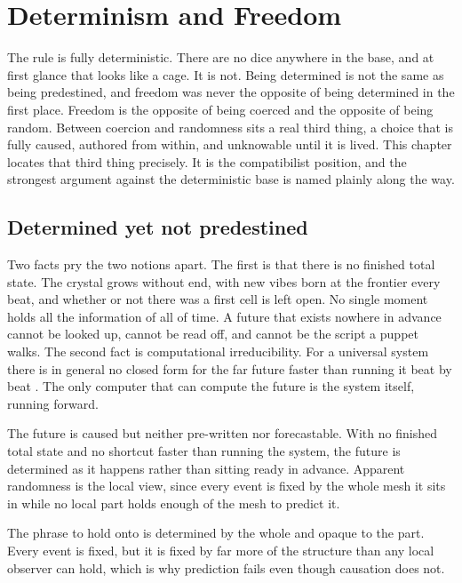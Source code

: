 \section{Determinism and Freedom}

The rule is fully deterministic. There are no dice anywhere in the base, and at first glance that looks like a
cage. It is not. Being determined is not the same as being predestined, and freedom was never the opposite of
being determined in the first place. Freedom is the opposite of being coerced and the opposite of being random.
Between coercion and randomness sits a real third thing, a choice that is fully caused, authored from within, and
unknowable until it is lived. This chapter locates that third thing precisely. It is the compatibilist position,
and the strongest argument against the deterministic base is named plainly along the way.

\subsection{Determined yet not predestined}

Two facts pry the two notions apart. The first is that there is no finished total state. The crystal grows without
end, with new vibes born at the frontier every beat, and whether or not there was a first cell is left open. No
single moment holds all the information of all of time. A future that exists nowhere in advance cannot be looked
up, cannot be read off, and cannot be the script a puppet walks. The second fact is computational
irreducibility. For a universal system there is in general no closed form for the far future faster than running it
beat by beat \cite{margenstern2013}. The only computer that can compute the future is the system itself, running
forward.

\begin{principle}
The future is caused but neither pre-written nor forecastable. With no finished total state and no shortcut faster
than running the system, the future is determined as it happens rather than sitting ready in advance. Apparent
randomness is the local view, since every event is fixed by the whole mesh it sits in while no local part holds
enough of the mesh to predict it.
\end{principle}

The phrase to hold onto is determined by the whole and opaque to the part. Every event is fixed, but it is fixed
by far more of the structure than any local observer can hold, which is why prediction fails even though
causation does not.


